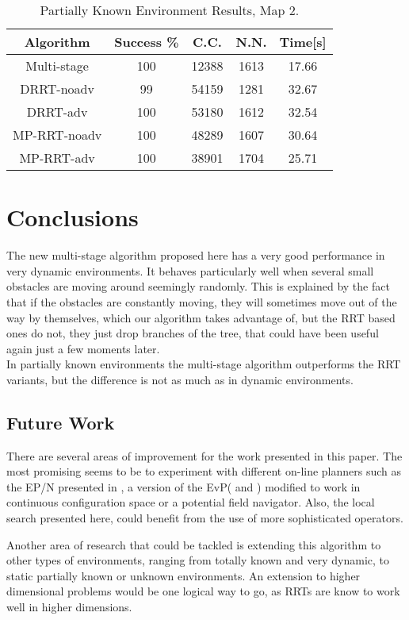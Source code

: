 \documentclass[10pt, conference, compsoc]{IEEEtran}
\begin{document}
\begin{table}[ht]
\caption{Partially Known Environment Results, Map 2.}
\label{table:partial2}
\centering
\begin{tabular}{|c||c|c|c|c|}
\hline
Algorithm & Success \% & C.C. & N.N. & Time[s]\\
\hline
Multi-stage & 100 & 12388 & 1613 & 17.66\\ 
\hline
DRRT-noadv & 99 & 54159 & 1281 & 32.67\\
\hline
DRRT-adv & 100 & 53180 & 1612 & 32.54\\
\hline
MP-RRT-noadv & 100 & 48289 & 1607 & 30.64\\
\hline
MP-RRT-adv & 100 & 38901 & 1704 & 25.71\\
\hline
\end{tabular}
\end{table}

\section{Conclusions}\label{sec:conclusions}
The new multi-stage algorithm proposed here has a very good performance in
very dynamic environments. It behaves particularly well when several small
obstacles are moving around seemingly randomly. This is explained by the fact
that if the obstacles are constantly moving, they will sometimes move out of the
way by themselves, which our algorithm takes advantage of, but the RRT based
ones do not, they just drop branches of the tree, that could have been useful
again just a few moments later.\\
In partially known environments the multi-stage algorithm outperforms the RRT
variants, but the difference is not as much as in dynamic environments.
\subsection{Future Work}
There are several areas of improvement for the work presented in this paper.
The most promising seems to be to experiment with different on-line planners
such as the EP/N presented in \cite{Xiao97}, a version of the
EvP(\cite{Alfaro05} and \cite{Alfaro08}) modified to work in
continuous configuration space or a potential field navigator. Also, the local
search presented here, could benefit from the use of more sophisticated
operators.

Another area of research that could be tackled is extending this algorithm to
other types of environments, ranging from totally
known and very dynamic, to static partially known or unknown environments. An
extension to higher dimensional problems would be one logical way to go, as RRTs
are know to work well in higher dimensions.
\end{document}
